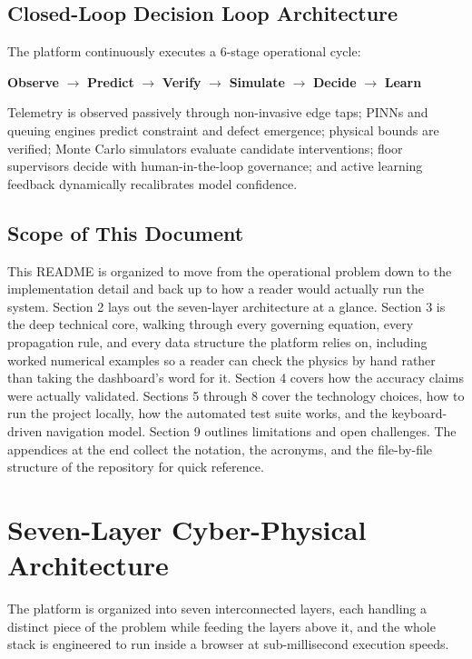 \documentclass[11pt]{article}
\begin{document}
\subsection{Closed-Loop Decision Loop Architecture}

The platform continuously executes a 6-stage operational cycle:
\begin{center}
\textbf{Observe} $\longrightarrow$ \textbf{Predict} $\longrightarrow$ \textbf{Verify} $\longrightarrow$ \textbf{Simulate} $\longrightarrow$ \textbf{Decide} $\longrightarrow$ \textbf{Learn}
\end{center}
Telemetry is observed passively through non-invasive edge taps; PINNs and queuing engines predict constraint and defect emergence; physical bounds are verified; Monte Carlo simulators evaluate candidate interventions; floor supervisors decide with human-in-the-loop governance; and active learning feedback dynamically recalibrates model confidence.

\subsection{Scope of This Document}

This README is organized to move from the operational problem down to the implementation detail and back up to how a reader would actually run the system. Section 2 lays out the seven-layer architecture at a glance. Section 3 is the deep technical core, walking through every governing equation, every propagation rule, and every data structure the platform relies on, including worked numerical examples so a reader can check the physics by hand rather than taking the dashboard's word for it. Section 4 covers how the accuracy claims were actually validated. Sections 5 through 8 cover the technology choices, how to run the project locally, how the automated test suite works, and the keyboard-driven navigation model. Section 9 outlines limitations and open challenges. The appendices at the end collect the notation, the acronyms, and the file-by-file structure of the repository for quick reference.

\newpage
\section{Seven-Layer Cyber-Physical Architecture}

The platform is organized into seven interconnected layers, each handling a distinct piece of the problem while feeding the layers above it, and the whole stack is engineered to run inside a browser at sub-millisecond execution speeds.
\end{document}
